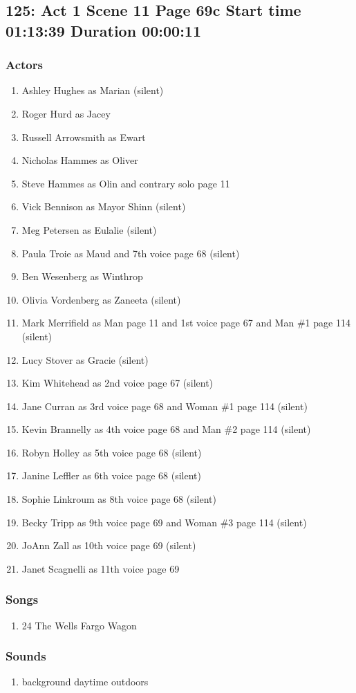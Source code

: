 \subsection{125: Act 1 Scene 11 Page 69c Start time 01:13:39 Duration 00:00:11}

\subsubsection{Actors}
\begin{enumerate}
\item Ashley Hughes as Marian (silent)
\item Roger Hurd as Jacey
\item Russell Arrowsmith as Ewart
\item Nicholas Hammes as Oliver
\item Steve Hammes as Olin and contrary solo page 11
\item Vick Bennison as Mayor Shinn (silent)
\item Meg Petersen as Eulalie (silent)
\item Paula Troie as Maud and 7th voice page 68 (silent)
\item Ben Wesenberg as Winthrop
\item Olivia Vordenberg as Zaneeta (silent)
\item Mark Merrifield as Man page 11 and 1st voice page 67 and Man \#1 page 114 (silent)
\item Lucy Stover as Gracie (silent)
\item Kim Whitehead as 2nd voice page 67 (silent)
\item Jane Curran as 3rd voice page 68 and Woman \#1 page 114 (silent)
\item Kevin Brannelly as 4th voice page 68 and Man \#2 page 114 (silent)
\item Robyn Holley as 5th voice page 68 (silent)
\item Janine Leffler as 6th voice page 68 (silent)
\item Sophie Linkroum as 8th voice page 68 (silent)
\item Becky Tripp as 9th voice page 69 and Woman \#3 page 114 (silent)
\item JoAnn Zall as 10th voice page 69 (silent)
\item Janet Scagnelli as 11th voice page 69
\end{enumerate}

\subsubsection{Songs}
\begin{enumerate}
\item 24 The Wells Fargo Wagon
\end{enumerate}\subsubsection{Sounds}
\begin{enumerate}
\item background daytime outdoors
\end{enumerate}

